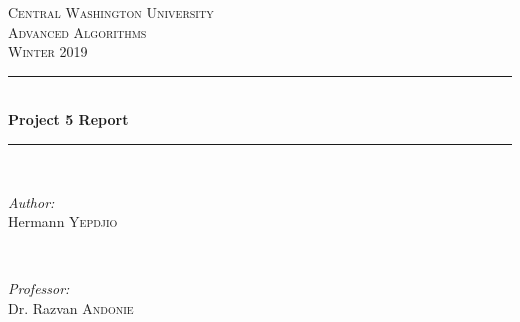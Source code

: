 \documentclass[12pt]{article}
\begin{document}
	
	\begin{titlepage}
		
		\newcommand{\HRule}{\rule{\linewidth}{0.5mm}} %
		
		\center %
		
		
		\textsc{\LARGE Central Washington University}\\[1.5cm] %
		\textsc{\Large Advanced Algorithms}\\[0.5cm] %
		\textsc{\large Winter 2019}\\[0.5cm] %
		
		
		\HRule \\[0.4cm]
		{ \huge \bfseries Project 5 Report}\\[0.4cm] %
		\HRule \\[1.5cm]
		
		
		\begin{minipage}{0.4\textwidth}
			\begin{flushleft} \large
				\emph{Author:}\\
				Hermann \textsc{Yepdjio} %
			\end{flushleft}
		\end{minipage}
		~
		\begin{minipage}{0.4\textwidth}
			\begin{flushright} \large
				\emph{Professor:} \\
				Dr. Razvan \textsc{Andonie} %
			\end{flushright}
		\end{minipage}\\[1cm]
		

\end{titlepage}
\end{document}
